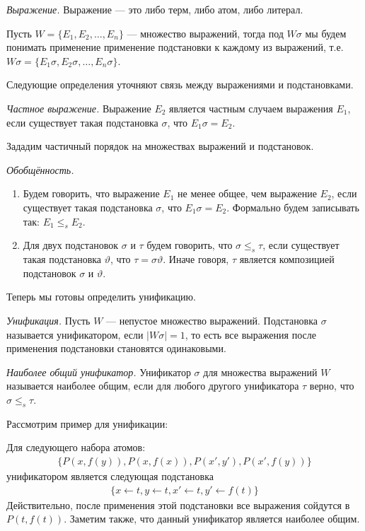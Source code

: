 \begin{definition}
  \emph{Выражение.} Выражение --- это либо терм, либо атом, либо литерал.
\end{definition}

Пусть $W = \{E_1, E_2, \ldots, E_n\}$ --- множество выражений, тогда под $W\sigma$ мы будем понимать применение применение подстановки к каждому из выражений, т.е. $W\sigma = \{E_1\sigma, E_2\sigma, \ldots, E_n\sigma\}$.

Следующие определения уточняют связь между выражениями и подстановками.
\begin{definition}
\emph{Частное выражение.} Выражение $E_2$ является частным случаем выражения $E_1$, если существует такая подстановка $\sigma$, что $E_1\sigma = E_2$.
\end{definition}

Зададим частичный порядок на множествах выражений и подстановок.
\begin{definition}
\emph{Обобщённость.}
  \begin{enumerate}
	\item Будем говорить, что выражение $E_1$ не менее общее, чем выражение $E_2$, если существует такая подстановка $\sigma$, что $E_1\sigma = E_2$. Формально будем записывать так: $E_1 \leq_s E_2$.
    \item Для двух подстановок $\sigma$ и $\tau$ будем говорить, что $\sigma \leq_s \tau$, если существует такая подстановка $\vartheta$, что $\tau = \sigma\vartheta$. Иначе говоря, $\tau$ является композицией подстановок $\sigma$ и $\vartheta$.
  \end{enumerate}
\end{definition}

Теперь мы готовы определить унификацию.

\begin{definition}
\emph{Унификация.} Пусть $W$ --- непустое множество выражений. Подстановка $\sigma$ называется унификатором, если $|W\sigma| = 1$, то есть все выражения после применения подстановки становятся одинаковыми.
\end{definition}

\begin{definition}
\emph{Наиболее общий унификатор.} Унификатор $\sigma$ для множества выражений $W$ называется наиболее общим, если для любого другого унификатора $\tau$ верно, что $\sigma \leq_s \tau$.
\end{definition}

Рассмотрим пример для унификации:
\begin{example}
Для следующего набора атомов:
\begin{gather*}
\{ P(x, f(y)), P(x, f(x)), P(x',y'), P(x', f(y)) \}
\end{gather*}
унификатором является следующая подстановка
\begin{gather*}
\{ x \leftarrow t, y \leftarrow t, x' \leftarrow t, y' \leftarrow f(t) \}
\end{gather*}
Действительно, после применения этой подстановки все выражения сойдутся в $P(t, f(t))$. Заметим также, что данный унификатор является наиболее общим.
\end{example}

